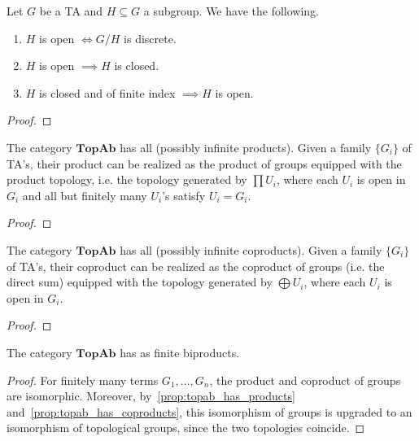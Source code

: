 \begin{proposition}\label{prop:basic_properties_about_open_sets} Let $G$ be a TA and $H \subseteq G$ a subgroup. We have the following.
\begin{enumerate}
    \item[(i)] $H$ is open $\iff G/H$ is discrete.
    \item[(ii)] $H$ is open $\implies H$ is closed.
    \item[(iii)] $H$ is closed and of finite index $\implies H$ is open.
\end{enumerate}
\end{proposition}
\begin{proof} \TODO
\end{proof}

\begin{proposition}\label{prop:topab_has_products} The category $\textbf{TopAb}$ has all (possibly infinite products). Given a family $\{G_i\}$ of TA's, their product can be realized as the product of groups equipped with the product topology, i.e. the topology generated by $\prod U_i$, where each $U_i$ is open in $G_i$ and all but finitely many $U_i$'s satisfy $U_i = G_i$.
\end{proposition}
\begin{proof} \TODO
\end{proof}


\begin{proposition}\label{prop:topab_has_coproducts} The category $\textbf{TopAb}$ has all (possibly infinite coproducts). Given a family $\{G_i\}$ of TA's, their coproduct can be realized as the coproduct of groups (i.e. the direct sum) equipped with the topology generated by $\bigoplus U_i$, where each $U_i$ is open in $G_i$.
\end{proposition}
\begin{proof} \TODO
\end{proof}

\begin{corollary} The category $\textbf{TopAb}$ has as finite biproducts.
\end{corollary}
\begin{proof} For finitely many terms $G_1, \ldots, G_n$, the product and coproduct of groups are isomorphic. Moreover, by~\cref{prop:topab_has_products} and~\cref{prop:topab_has_coproducts}, this isomorphism of groups is upgraded to an isomorphism of topological groups, since the two topologies coincide.
\end{proof}

